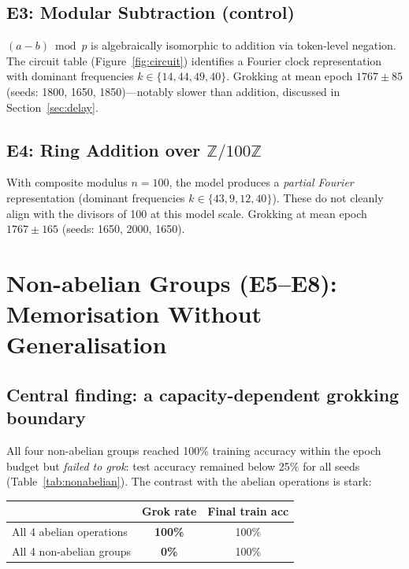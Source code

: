 \documentclass[11pt]{article}
\begin{document}
\subsection{E3: Modular Subtraction (control)}

$(a-b)\bmod p$ is algebraically isomorphic to addition via token-level
negation. The circuit table (Figure~\ref{fig:circuit}) identifies a
Fourier clock representation with dominant frequencies
$k\in\{14,44,49,40\}$. Grokking at mean epoch \textbf{$1767\pm85$}
(seeds: 1800, 1650, 1850)---notably slower than addition,
discussed in Section~\ref{sec:delay}.

\subsection{E4: Ring Addition over $\mathbb{Z}/100\mathbb{Z}$}

With composite modulus $n=100$, the model produces a \emph{partial Fourier}
representation (dominant frequencies $k\in\{43,9,12,40\}$). These do not
cleanly align with the divisors of 100 at this model scale.
Grokking at mean epoch \textbf{$1767\pm165$}
(seeds: 1650, 2000, 1650).

\section{Non-abelian Groups (E5--E8): Memorisation Without Generalisation}
\label{sec:nonabelian}

\subsection{Central finding: a capacity-dependent grokking boundary}

All four non-abelian groups reached 100\% training accuracy within the
epoch budget but \emph{failed to grok}: test accuracy remained below
25\% for all seeds (Table~\ref{tab:nonabelian}).
The contrast with the abelian operations is stark:

\begin{center}
  \renewcommand{\arraystretch}{1.2}
  \begin{tabular}{lcc}
    \toprule
    & \textbf{Grok rate} & \textbf{Final train acc} \\
    \midrule
    All 4 abelian operations & \textbf{100\%} & 100\% \\
    All 4 non-abelian groups & \textbf{0\%}   & 100\% \\
    \bottomrule
  \end{tabular}
\end{center}
\end{document}
